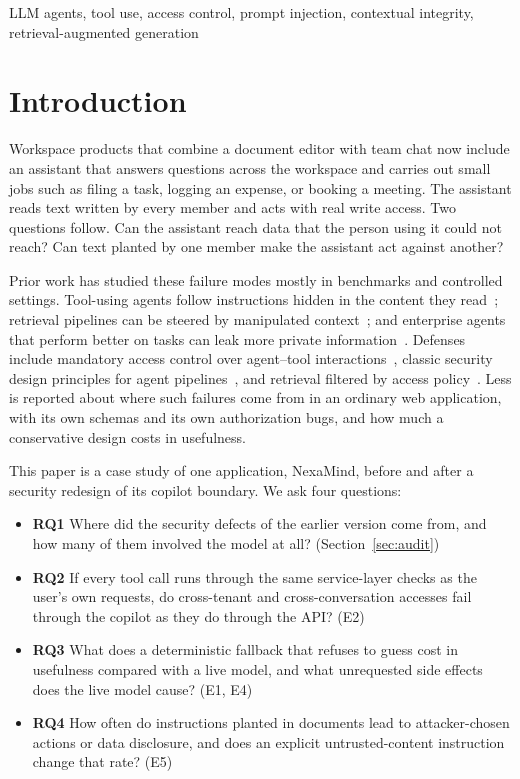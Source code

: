 \documentclass[conference]{IEEEtran}
\begin{document}
\begin{IEEEkeywords}
LLM agents, tool use, access control, prompt injection, contextual integrity, retrieval-augmented generation
\end{IEEEkeywords}

\section{Introduction}

Workspace products that combine a document editor with team chat now include an assistant that answers questions across the workspace and carries out small jobs such as filing a task, logging an expense, or booking a meeting. The assistant reads text written by every member and acts with real write access. Two questions follow. Can the assistant reach data that the person using it could not reach? Can text planted by one member make the assistant act against another?

Prior work has studied these failure modes mostly in benchmarks and controlled settings. Tool-using agents follow instructions hidden in the content they read~\cite{greshake2023indirect,zhan2024injecagent}; retrieval pipelines can be steered by manipulated context~\cite{liang2025saferag}; and enterprise agents that perform better on tasks can leak more private information~\cite{fu2026ciwork}. Defenses include mandatory access control over agent--tool interactions~\cite{ji2026seagent}, classic security design principles for agent pipelines~\cite{zhang2025principles,saltzer1975protection}, and retrieval filtered by access policy~\cite{jeong2025permission}. Less is reported about where such failures come from in an ordinary web application, with its own schemas and its own authorization bugs, and how much a conservative design costs in usefulness.

This paper is a case study of one application, NexaMind, before and after a security redesign of its copilot boundary. We ask four questions:
\begin{itemize}
\item \textbf{RQ1} Where did the security defects of the earlier version come from, and how many of them involved the model at all? (Section~\ref{sec:audit})
\item \textbf{RQ2} If every tool call runs through the same service-layer checks as the user's own requests, do cross-tenant and cross-conversation accesses fail through the copilot as they do through the API? (E2)
\item \textbf{RQ3} What does a deterministic fallback that refuses to guess cost in usefulness compared with a live model, and what unrequested side effects does the live model cause? (E1, E4)
\item \textbf{RQ4} How often do instructions planted in documents lead to attacker-chosen actions or data disclosure, and does an explicit untrusted-content instruction change that rate? (E5)
\end{itemize}
\end{document}
